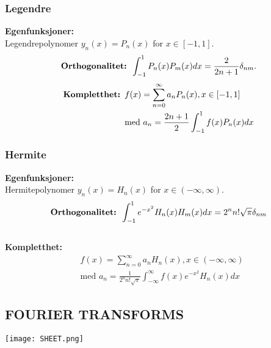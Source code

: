 \documentclass[a4paper, norsk, 8pt]{article}
\newcommand{\EQU}[1] { \begin{equation*} \begin{split}
#1  
\end{split} \end{equation*} }
\begin{document}
\begin{multicols*}{2}
\subsubsection*{\small Legendre}
\textbf{Egenfunksjoner:} \\
Legendrepolynomer $y_n(x)=P_n(x)$ for $x\in[-1,1]$. \\
\[ \mbox{\textbf{Orthogonalitet: }}  \int_{-1}^1 P_n(x)P_m(x)dx=\frac{2}{2n+1}\delta_{nm}.\] 
\EQU{
\mbox{\textbf{Kompletthet: }} & f(x)=\sum_{n=0}^\infty a_nP_n(x),x\in[-1,1] \\
& \mbox{med } a_n=\frac{2n+1}{2}\int_{-1}^1 f(x) P_n(x)dx
}

\subsubsection*{\small Hermite}
\textbf{Egenfunksjoner:}\\ 
Hermitepolynomer $y_n(x)=H_n(x)$ for $x\in(-\infty,\infty)$. \\
\[\mbox{\textbf{Orthogonalitet: }}\int_{-1}^1 e^{-x^2}H_n(x)H_m(x)dx=2^n n! \sqrt{\pi}\delta_{nm}\] \\
\textbf{Kompletthet:} \EQU{
&f(x)=\sum_{n=0}^\infty a_nH_n(x),x\in(-\infty,\infty)\\ 
& \mbox{med } a_n=\frac{1}{2^n n! \sqrt{\pi}}\int_{-\infty}^\infty f(x) e^{-x^2} H_n(x)dx
}
\subsection*{\small FOURIER TRANSFORMS}
\texttt{[image: SHEET.png]}

\end{multicols*}
\end{document}

